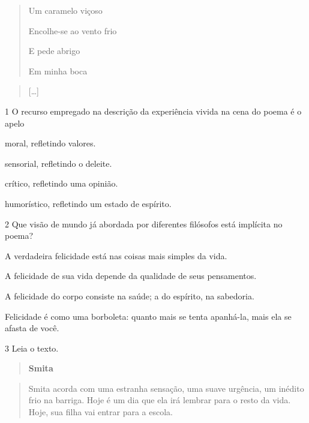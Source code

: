 \begin{quote}
Um caramelo viçoso

Encolhe-se ao vento frio

E pede abrigo

Em minha boca
\end{quote}

\begin{quote}
{[}\ldots{]}
\end{quote}


\num{1} O recurso empregado na descrição da experiência vivida na cena do poema é o apelo

\begin{escolha}
\item moral, refletindo valores.

\item sensorial, refletindo o deleite.

\item crítico, refletindo uma opinião.

\item humorístico, refletindo um estado de espírito.
\end{escolha}

\num{2} Que visão de mundo já abordada por diferentes filósofos está implícita no poema?

\begin{escolha}
\item A verdadeira felicidade está nas coisas mais simples da vida.

\item A felicidade de sua vida depende da qualidade de seus pensamentos.

\item A felicidade do corpo consiste na saúde; a do espírito, na sabedoria.

\item Felicidade é como uma borboleta: quanto mais se tenta apanhá-la, mais ela se afasta de você.
\end{escolha}

\num{3} Leia o texto.

\begin{quote}
\centering\textbf{Smita}
\end{quote}


\begin{quote}
Smita acorda com uma estranha sensação, uma suave urgência, um inédito
frio na barriga. Hoje é um dia que ela irá lembrar para o resto da vida.
Hoje, sua filha vai entrar para a escola.
\end{quote}

